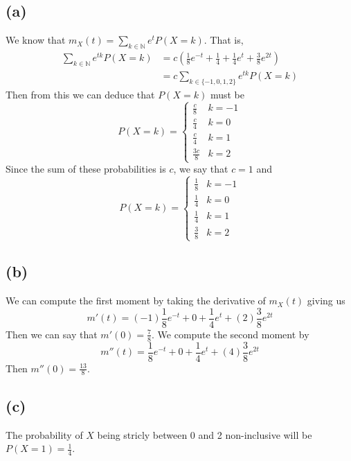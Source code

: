\documentclass{article}
\theoremstyle{definition}
\begin{document}
\subsection*{(a)} We know that $m_X(t) = \sum_{k \in \mathbb{N}} e^t P(X = k)$. 
That is,
\begin{align*}
    \sum_{k \in \mathbb{N}} e^{tk} P(X = k) &= c \left(\frac{1}{8}e^{-t} + \frac{1}{4} +  \frac{1}{4}e^t + \frac{3}{8}e^{2t}\right)\\
    &=c \sum_{k \in \{-1, 0, 1, 2\}} e^{tk} P(X = k)
\end{align*}
Then from this we can deduce that $P(X = k)$ must be 
\[
    P(X = k) = \begin{cases}
        \frac{c}{8} & k = -1\\
        \frac{c}{4} & k = 0 \\
        \frac{c}{4} & k = 1 \\
        \frac{3c}{8} & k = 2
    \end{cases}
\]
Since the sum of these probabilities is $c$, we say that $c = 1$ and 
\[
    P(X = k) = \begin{cases}
        \frac{1}{8} & k = -1\\
        \frac{1}{4} & k = 0 \\
        \frac{1}{4} & k = 1 \\
        \frac{3}{8} & k = 2
    \end{cases}
\]
\subsection*{(b)}
We can compute the first moment by taking the derivative of $m_X(t)$ giving us 
\[
    m'(t) = (-1)\frac{1}{8}e^{-t} + 0 + \frac{1}{4}e^t + (2) \frac{3}{8}e^{2t}
\]
Then we can say that $m'(0) = \frac{7}{8}$. We compute the second moment by 
\[
    m''(t) = \frac{1}{8}e^{-t} + 0 + \frac{1}{4}e^t + (4) \frac{3}{8} e^{2t}
\]
Then $m''(0) = \frac{13}{8}$.
\subsection*{(c)}
The probability of $X$ being stricly between 0 and 2 non-inclusive will be $P(X = 1) = \frac{1}{4}$.
\end{document}
